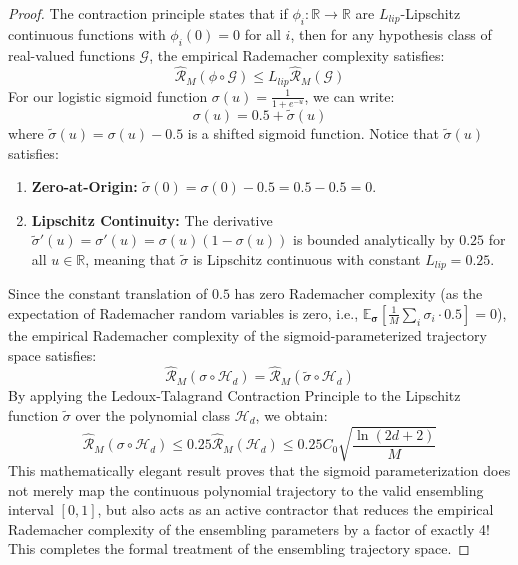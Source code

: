 \documentclass{article}
\theoremstyle{plain}
\theoremstyle{definition}
\theoremstyle{remark}
\begin{document}
\begin{proof}
The contraction principle states that if $\phi_i: \mathbb{R} \to \mathbb{R}$ are $L_{lip}$-Lipschitz continuous functions with $\phi_i(0) = 0$ for all $i$, then for any hypothesis class of real-valued functions $\mathcal{G}$, the empirical Rademacher complexity satisfies:
\begin{equation}
\widehat{\mathcal{R}}_M(\phi \circ \mathcal{G}) \le L_{lip} \widehat{\mathcal{R}}_M(\mathcal{G})
\end{equation}
For our logistic sigmoid function $\sigma(u) = \frac{1}{1 + e^{-u}}$, we can write:
\begin{equation}
\sigma(u) = 0.5 + \tilde{\sigma}(u)
\end{equation}
where $\tilde{\sigma}(u) = \sigma(u) - 0.5$ is a shifted sigmoid function. Notice that $\tilde{\sigma}(u)$ satisfies:
\begin{enumerate}
    \item \textbf{Zero-at-Origin:} $\tilde{\sigma}(0) = \sigma(0) - 0.5 = 0.5 - 0.5 = 0$.
    \item \textbf{Lipschitz Continuity:} The derivative $\tilde{\sigma}'(u) = \sigma'(u) = \sigma(u)(1 - \sigma(u))$ is bounded analytically by $0.25$ for all $u \in \mathbb{R}$, meaning that $\tilde{\sigma}$ is Lipschitz continuous with constant $L_{lip} = 0.25$.
\end{enumerate}
Since the constant translation of $0.5$ has zero Rademacher complexity (as the expectation of Rademacher random variables is zero, i.e., $\mathbb{E}_{\boldsymbol{\sigma}} [ \frac{1}{M} \sum_{i} \sigma_i \cdot 0.5 ] = 0$), the empirical Rademacher complexity of the sigmoid-parameterized trajectory space satisfies:
\begin{equation}
\widehat{\mathcal{R}}_M(\sigma \circ \mathcal{H}_d) = \widehat{\mathcal{R}}_M(\tilde{\sigma} \circ \mathcal{H}_d)
\end{equation}
By applying the Ledoux-Talagrand Contraction Principle to the Lipschitz function $\tilde{\sigma}$ over the polynomial class $\mathcal{H}_d$, we obtain:
\begin{equation}
\widehat{\mathcal{R}}_M(\sigma \circ \mathcal{H}_d) \le 0.25 \widehat{\mathcal{R}}_M(\mathcal{H}_d) \le 0.25 C_0 \sqrt{\frac{\ln(2 d + 2)}{M}}
\end{equation}
This mathematically elegant result proves that the sigmoid parameterization does not merely map the continuous polynomial trajectory to the valid ensembling interval $[0, 1]$, but also acts as an active contractor that reduces the empirical Rademacher complexity of the ensembling parameters by a factor of exactly 4! This completes the formal treatment of the ensembling trajectory space.
\end{proof}
\end{document}
